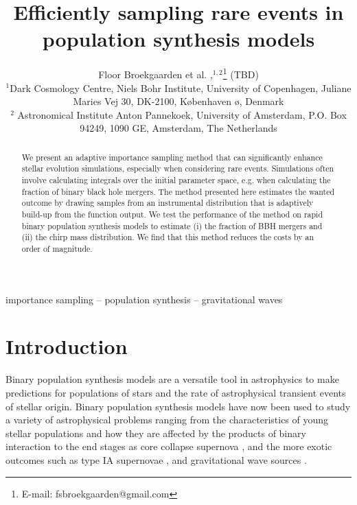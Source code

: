 \documentclass[a4paper,fleqn,usenatbib]{mnras}
\title[]{Efficiently sampling rare events in population synthesis models}
\author[]{Floor Broekgaarden et al. ,$^{1,2}$\thanks{E-mail: fsbroekgaarden@gmail.com}
(TBD)
\\
$^{1}$Dark Cosmology Centre, Niels Bohr Institute, University of
Copenhagen, Juliane Maries Vej 30, DK-2100, K\o benhaven \o,
Denmark\\
$^{2}$ Astronomical Institute Anton Pannekoek, University of Amsterdam, P.O. Box 94249, 1090 GE, Amsterdam, The Netherlands \\
}
\begin{document}
\label{firstpage}
\pagerange{\pageref{firstpage}--\pageref{lastpage}}
\maketitle

\begin{abstract}
We present an adaptive importance sampling method that can significantly enhance stellar evolution simulations, especially when considering rare events. Simulations often involve calculating integrals over the initial parameter space, e.g. when calculating the fraction of binary black hole mergers. The method presented here estimates the wanted outcome by drawing samples from an instrumental distribution that is adaptively build-up from the function output. We test the performance of the method on rapid binary population synthesis models to estimate (i) the fraction of BBH mergers and (ii) the chirp mass distribution. We find that this method reduces the costs by an order of magnitude.   
\end{abstract}

\begin{keywords}
importance sampling -- population synthesis -- gravitational waves
\end{keywords}



\section{Introduction}

Binary population synthesis models are a versatile tool in astrophysics to make predictions for populations of stars and the rate of astrophysical transient events of stellar origin. 
Binary population synthesis models have now been used to study a variety of astrophysical problems ranging from the characteristics of young stellar populations and how they are affected by the products of binary interaction \citep{de2013rotation,schneider2014bonnsai}  to the end stages as core collapse supernova \citep{zapartas2017delay}, and the more exotic outcomes such as type IA supernovae \citep{toonen2012supernova}, and gravitational wave sources \citep{stevenson2017formation}.
\end{document}
